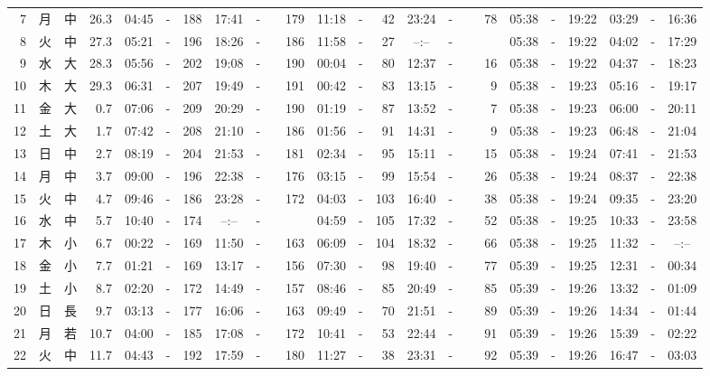 \documentclass[12pt,a4j]{jsarticle}
\begin{document}
\begin{table}[htbp]
\begin{center}
{\begin{tabular}{|rc|cr|ccrccr|ccrccr|ccc|ccc|}
 7 & 月 & 中 & 26.3 &  04:45 &-& 188 &  17:41 &-& 179 &  11:18 &-&  42 &  23:24 &-&  78 & 05:38 & -& 19:22 & 03:29 & -& 16:36 \\
 8 & 火 & 中 & 27.3 &  05:21 &-& 196 &  18:26 &-& 186 &  11:58 &-&  27 &  --:-- &-&~~~~~ & 05:38 & -& 19:22 & 04:02 & -& 17:29 \\
 9 & 水 & 大 & 28.3 &  05:56 &-& 202 &  19:08 &-& 190 &  00:04 &-&  80 &  12:37 &-&  16 & 05:38 & -& 19:22 & 04:37 & -& 18:23 \\
10 & 木 & 大 & 29.3 &  06:31 &-& 207 &  19:49 &-& 191 &  00:42 &-&  83 &  13:15 &-&   9 & 05:38 & -& 19:23 & 05:16 & -& 19:17 \\
11 & 金 & 大 &  0.7 &  07:06 &-& 209 &  20:29 &-& 190 &  01:19 &-&  87 &  13:52 &-&   7 & 05:38 & -& 19:23 & 06:00 & -& 20:11 \\
12 & 土 & 大 &  1.7 &  07:42 &-& 208 &  21:10 &-& 186 &  01:56 &-&  91 &  14:31 &-&   9 & 05:38 & -& 19:23 & 06:48 & -& 21:04 \\
13 & 日 & 中 &  2.7 &  08:19 &-& 204 &  21:53 &-& 181 &  02:34 &-&  95 &  15:11 &-&  15 & 05:38 & -& 19:24 & 07:41 & -& 21:53 \\
14 & 月 & 中 &  3.7 &  09:00 &-& 196 &  22:38 &-& 176 &  03:15 &-&  99 &  15:54 &-&  26 & 05:38 & -& 19:24 & 08:37 & -& 22:38 \\
15 & 火 & 中 &  4.7 &  09:46 &-& 186 &  23:28 &-& 172 &  04:03 &-& 103 &  16:40 &-&  38 & 05:38 & -& 19:24 & 09:35 & -& 23:20 \\
16 & 水 & 中 &  5.7 &  10:40 &-& 174 &  --:-- &-&~~~~~ &  04:59 &-& 105 &  17:32 &-&  52 & 05:38 & -& 19:25 & 10:33 & -& 23:58 \\
17 & 木 & 小 &  6.7 &  00:22 &-& 169 &  11:50 &-& 163 &  06:09 &-& 104 &  18:32 &-&  66 & 05:38 & -& 19:25 & 11:32 & -& --:-- \\
18 & 金 & 小 &  7.7 &  01:21 &-& 169 &  13:17 &-& 156 &  07:30 &-&  98 &  19:40 &-&  77 & 05:39 & -& 19:25 & 12:31 & -& 00:34 \\
19 & 土 & 小 &  8.7 &  02:20 &-& 172 &  14:49 &-& 157 &  08:46 &-&  85 &  20:49 &-&  85 & 05:39 & -& 19:26 & 13:32 & -& 01:09 \\
20 & 日 & 長 &  9.7 &  03:13 &-& 177 &  16:06 &-& 163 &  09:49 &-&  70 &  21:51 &-&  89 & 05:39 & -& 19:26 & 14:34 & -& 01:44 \\
21 & 月 & 若 & 10.7 &  04:00 &-& 185 &  17:08 &-& 172 &  10:41 &-&  53 &  22:44 &-&  91 & 05:39 & -& 19:26 & 15:39 & -& 02:22 \\
22 & 火 & 中 & 11.7 &  04:43 &-& 192 &  17:59 &-& 180 &  11:27 &-&  38 &  23:31 &-&  92 & 05:39 & -& 19:26 & 16:47 & -& 03:03 \\

\end{tabular}}
\end{center}
\end{table}
\end{document}
